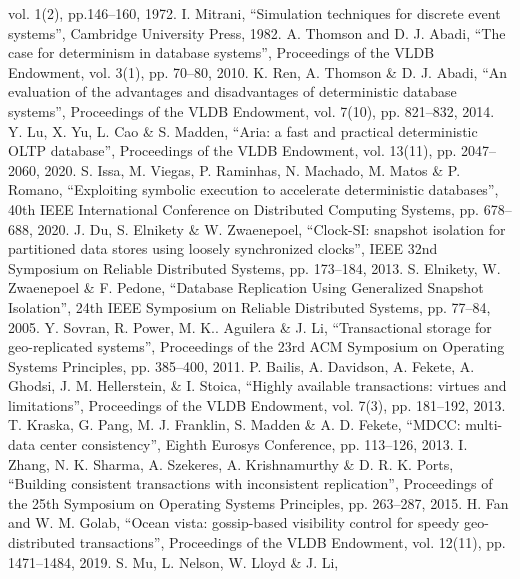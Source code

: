 \begin{thebibliography}{00}
  vol. 1(2),
  pp.146--160,
  1972.  
  I. Mitrani,
  ``Simulation techniques for discrete event systems'',
  Cambridge University Press,
  1982.
  A. Thomson and D. J. Abadi,
  ``The case for determinism in database systems'',
  Proceedings of the VLDB Endowment,
  vol. 3(1),
  pp. 70--80,
  2010.
  K. Ren, A. Thomson \& D. J. Abadi,
  ``An evaluation of the advantages and disadvantages of deterministic database
  systems'',
  Proceedings of the VLDB Endowment,
  vol. 7(10),
  pp. 821--832,
  2014.
  Y. Lu, X. Yu, L. Cao \& S. Madden,
  ``Aria: {a} fast and practical deterministic {OLTP} database'',
  Proceedings of the VLDB Endowment,
  vol. 13(11),
  pp. 2047--2060,
  2020.
  S. Issa, M. Viegas, P. Raminhas, N. Machado, M. Matos \& P. Romano,
  ``Exploiting symbolic execution to accelerate deterministic databases'',
  40th {IEEE} International Conference on Distributed Computing Systems,
  pp. 678--688,
  2020.  
  J. Du, S. Elnikety \& W. Zwaenepoel,
  ``Clock-{SI}: snapshot isolation for partitioned data stores using loosely synchronized clocks'',
  {IEEE} 32nd Symposium on Reliable Distributed Systems,
  pp. 173--184,
  2013.
  S. Elnikety, W. Zwaenepoel \& F. Pedone,
  ``Database Replication Using Generalized Snapshot Isolation'',
  24th {IEEE} Symposium on Reliable Distributed Systems,
  pp. 77--84,
  2005.
  Y. Sovran, R. Power, M. K.. Aguilera \& J. Li,
  ``Transactional storage for geo-replicated systems'',
  Proceedings of the 23rd {ACM} Symposium on Operating Systems Principles,
  pp. 385--400,
  2011.
  P. Bailis, A. Davidson, A. Fekete, A. Ghodsi, J. M. Hellerstein, \& I. Stoica,
  ``Highly available transactions: virtues and limitations'',
  Proceedings of the VLDB Endowment,
  vol. 7(3),
  pp. 181--192,
  2013.
  T. Kraska, G. Pang, M. J. Franklin, S. Madden \& A. D. Fekete,
  ``{MDCC:} multi-data center consistency'',
  Eighth Eurosys Conference,
  pp. 113--126,
  2013.
  I. Zhang, N. K. Sharma, A. Szekeres, A. Krishnamurthy \& D. R. K. Ports,
  ``Building consistent transactions with inconsistent replication'',
  Proceedings of the 25th Symposium on Operating Systems Principles,
  pp. 263--287,
  2015.
  H. Fan and W. M. Golab,
  ``Ocean vista: gossip-based visibility control for speedy geo-distributed transactions'',
  Proceedings of the VLDB Endowment,
  vol. 12(11),
  pp. 1471--1484,
  2019.
  S. Mu, L. Nelson, W. Lloyd \& J. Li,

\end{thebibliography}

